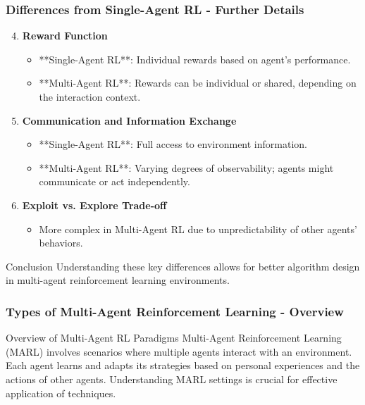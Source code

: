 \documentclass[aspectratio=169]{beamer}
\begin{document}
\begin{frame}[fragile]
    \frametitle{Differences from Single-Agent RL - Further Details}
    \begin{enumerate}
        \setcounter{enumi}{3}
        \item \textbf{Reward Function}
            \begin{itemize}
                \item **Single-Agent RL**: Individual rewards based on agent's performance.
                \item **Multi-Agent RL**: Rewards can be individual or shared, depending on the interaction context.
            \end{itemize}

        \item \textbf{Communication and Information Exchange}
            \begin{itemize}
                \item **Single-Agent RL**: Full access to environment information.
                \item **Multi-Agent RL**: Varying degrees of observability; agents might communicate or act independently.
            \end{itemize}

        \item \textbf{Exploit vs. Explore Trade-off}
            \begin{itemize}
                \item More complex in Multi-Agent RL due to unpredictability of other agents' behaviors.
            \end{itemize}
    \end{enumerate}

    \begin{block}{Conclusion}
        Understanding these key differences allows for better algorithm design in multi-agent reinforcement learning environments.
    \end{block}
\end{frame}

\begin{frame}[fragile]
    \frametitle{Types of Multi-Agent Reinforcement Learning - Overview}
    \begin{block}{Overview of Multi-Agent RL Paradigms}
        Multi-Agent Reinforcement Learning (MARL) involves scenarios where multiple agents interact with an environment. Each agent learns and adapts its strategies based on personal experiences and the actions of other agents. 
        Understanding MARL settings is crucial for effective application of techniques.
    \end{block}
\end{frame}
\end{document}
